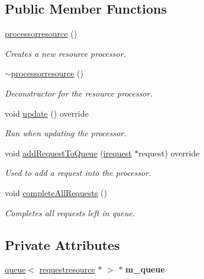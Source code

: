 \subsection*{Public Member Functions}
\begin{DoxyCompactItemize}
\item 
\hyperlink{classflounder_1_1processorresource_a8c39c4f6b683d2e92a0d59ed524ac39d}{processorresource} ()
\begin{DoxyCompactList}\small\item\em Creates a new resource processor. \end{DoxyCompactList}\item 
\hyperlink{classflounder_1_1processorresource_a67b0043570785f6769b6bf6882682d52}{$\sim$processorresource} ()
\begin{DoxyCompactList}\small\item\em Deconstructor for the resource processor. \end{DoxyCompactList}\item 
void \hyperlink{classflounder_1_1processorresource_afaeb27a9673c1f9b4366b537b7c0d377}{update} () override
\begin{DoxyCompactList}\small\item\em Run when updating the processor. \end{DoxyCompactList}\item 
void \hyperlink{classflounder_1_1processorresource_a4ae0dda615f98e93faadda22e74d61e2}{add\+Request\+To\+Queue} (\hyperlink{classflounder_1_1irequest}{irequest} $\ast$request) override
\begin{DoxyCompactList}\small\item\em Used to add a request into the processor. \end{DoxyCompactList}\item 
void \hyperlink{classflounder_1_1processorresource_afde339d8e44544307abd585e8294fa85}{complete\+All\+Requests} ()
\begin{DoxyCompactList}\small\item\em Completes all requests left in queue. \end{DoxyCompactList}\end{DoxyCompactItemize}
\subsection*{Private Attributes}
\begin{DoxyCompactItemize}
\item 
\mbox{\label{classflounder_1_1processorresource_a4354aede707e752eba415c76f19ec104}} 
\hyperlink{classflounder_1_1queue}{queue}$<$ \hyperlink{classflounder_1_1requestresource}{requestresource} $\ast$ $>$ $\ast$ {\bfseries m\+\_\+queue}
\end{DoxyCompactItemize}
